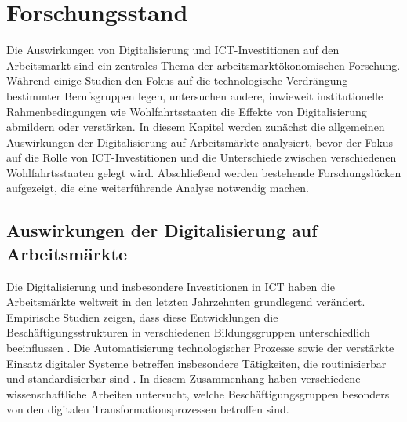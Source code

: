 
\section{Forschungsstand}

Die Auswirkungen von Digitalisierung und \ac{ICT}-Investitionen auf den Arbeitsmarkt sind 
ein zentrales Thema der arbeitsmarktökonomischen Forschung. Während einige Studien den 
Fokus auf die technologische Verdrängung bestimmter Berufsgruppen legen, untersuchen 
andere, inwieweit institutionelle Rahmenbedingungen wie Wohlfahrtsstaaten die Effekte von 
Digitalisierung abmildern oder verstärken. In diesem Kapitel werden zunächst die 
allgemeinen Auswirkungen der Digitalisierung auf Arbeitsmärkte analysiert, bevor der Fokus 
auf die Rolle von \ac{ICT}-Investitionen und die Unterschiede zwischen verschiedenen 
Wohlfahrtsstaaten gelegt wird. Abschließend werden bestehende Forschungslücken aufgezeigt, 
die eine weiterführende Analyse notwendig machen.


\subsection{Auswirkungen der Digitalisierung auf Arbeitsmärkte}

Die Digitalisierung und insbesondere Investitionen in \ac{ICT} haben die Arbeitsmärkte 
weltweit in den letzten Jahrzehnten grundlegend verändert. Empirische Studien zeigen, dass 
diese Entwicklungen die Beschäftigungsstrukturen in verschiedenen Bildungsgruppen 
unterschiedlich beeinflussen \parencite[vgl.][S. 7]{autor2013thegrowth}. Die Automatisierung 
technologischer Prozesse sowie der verstärkte Einsatz digitaler Systeme betreffen 
insbesondere Tätigkeiten, die routinisierbar und standardisierbar sind 
\parencite[vgl.][S. 20]{frey2013thefuture}. In diesem Zusammenhang haben verschiedene 
wissenschaftliche Arbeiten untersucht, welche Beschäftigungsgruppen besonders von den 
digitalen Transformationsprozessen betroffen sind.

